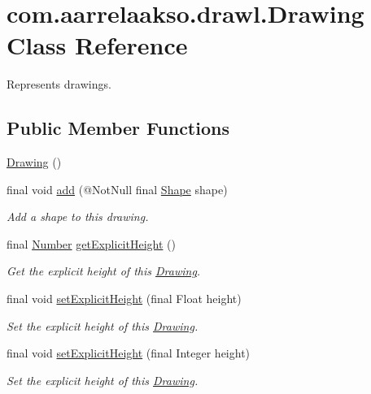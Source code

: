 \hypertarget{classcom_1_1aarrelaakso_1_1drawl_1_1_drawing}{}\section{com.\+aarrelaakso.\+drawl.\+Drawing Class Reference}
\label{classcom_1_1aarrelaakso_1_1drawl_1_1_drawing}


Represents drawings.  


\subsection*{Public Member Functions}
\begin{DoxyCompactItemize}
\item 
\hyperlink{classcom_1_1aarrelaakso_1_1drawl_1_1_drawing_adc398fbdb9acaa2c09ab8f048ff45109}{Drawing} ()
\item 
final void \hyperlink{classcom_1_1aarrelaakso_1_1drawl_1_1_drawing_abb794d2aac631a7e20f3cd6948d117fe}{add} (@Not\+Null final \hyperlink{classcom_1_1aarrelaakso_1_1drawl_1_1_shape}{Shape} shape)
\begin{DoxyCompactList}\small\item\em Add a shape to this drawing. \end{DoxyCompactList}\item 
final \hyperlink{interfacecom_1_1aarrelaakso_1_1drawl_1_1_number}{Number} \hyperlink{classcom_1_1aarrelaakso_1_1drawl_1_1_drawing_ade424cd3d355473603555ad6ce746e23}{get\+Explicit\+Height} ()
\begin{DoxyCompactList}\small\item\em Get the explicit height of this \hyperlink{classcom_1_1aarrelaakso_1_1drawl_1_1_drawing}{Drawing}. \end{DoxyCompactList}\item 
final void \hyperlink{classcom_1_1aarrelaakso_1_1drawl_1_1_drawing_a4a88952ac7f26d5a3be9aa3d32e2643a}{set\+Explicit\+Height} (final Float height)
\begin{DoxyCompactList}\small\item\em Set the explicit height of this \hyperlink{classcom_1_1aarrelaakso_1_1drawl_1_1_drawing}{Drawing}. \end{DoxyCompactList}\item 
final void \hyperlink{classcom_1_1aarrelaakso_1_1drawl_1_1_drawing_a58214bce0e8aa1f15a88f6daaf0e85c6}{set\+Explicit\+Height} (final Integer height)
\begin{DoxyCompactList}\small\item\em Set the explicit height of this \hyperlink{classcom_1_1aarrelaakso_1_1drawl_1_1_drawing}{Drawing}. \end{DoxyCompactList}\item 

\end{DoxyCompactItemize}
